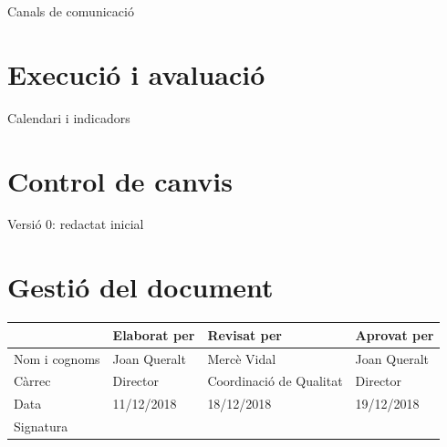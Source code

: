 \documentclass[fontsize=10pt,%
paper=a4,%
DIV=14,%
twoside,%
pagesize=auto,%
parskip=half,
captions=tableheading,%
numbers=noenddot,%
toc=graduated%
]{scrartcl}
\renewcommand{\arraystretch}{1.75}%
\renewcommand{\arraystretch}{1.75}%
\begin{document}
Canals de comunicació

\section{Execució i avaluació}\label{sec:execiaval}

Calendari i indicadors



\section{Control de canvis}

Versió 0: redactat inicial

\section{Gestió del document}\label{sec:gestiodoc}


\begin{center}\scriptsize\sffamily
\renewcommand{\arraystretch}{1.75}%
\begin{tabular}{lllp{4cm}}\hline
              & Elaborat per  & Revisat per   & Aprovat per\\ \hline
Nom i cognoms & Joan Queralt & Mercè Vidal & Joan Queralt\\
Càrrec        & Director & Coordinació de Qualitat & Director\\
Data          & 11/12/2018 & 18/12/2018 & 19/12/2018\\\hline
Signatura     &   &   &
\end{tabular}
\end{center}
\end{document}
